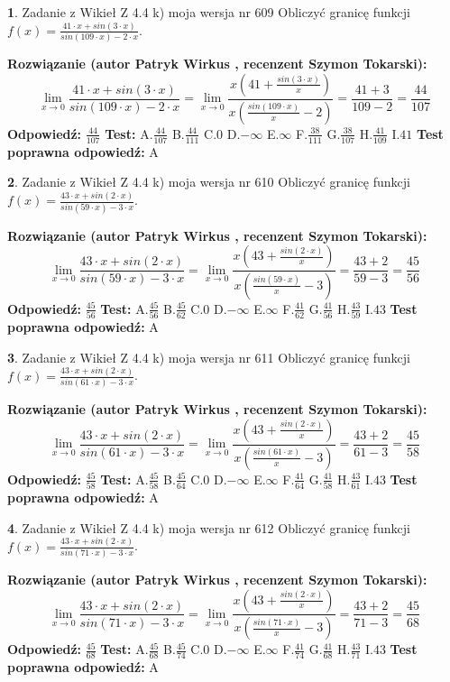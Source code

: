 \documentclass[12pt, a4paper]{article}
\theoremstyle{definition} %
\newtheorem{zad}{}
\newcommand{\zadStart}[1]{\begin{zad}#1\newline}
\newcommand{\zadStop}{\end{zad}}
\newcommand{\rozwStart}[2]{\noindent \textbf{Rozwiązanie (autor #1 , recenzent #2): }\newline}
\newcommand{\rozwStop}{\newline}
\newcommand{\odpStart}{\noindent \textbf{Odpowiedź:}\newline}
\newcommand{\odpStop}{\newline}
\newcommand{\testStart}{\noindent \textbf{Test:}\newline}
\newcommand{\testStop}{\newline}
\newcommand{\kluczStart}{\noindent \textbf{Test poprawna odpowiedź:}\newline}
\newcommand{\kluczStop}{\newline}
\begin{document}
\zadStart{Zadanie z Wikieł Z 4.4 k) moja wersja nr 609}
Obliczyć granicę funkcji $f(x)=\frac{41\cdot x +sin(3\cdot x)}{sin(109\cdot x) -2\cdot x}$.
\zadStop
\rozwStart{Patryk Wirkus}{Szymon Tokarski}
$$\lim\limits_{x\to 0}\frac{41\cdot x +sin(3\cdot x)}{sin(109\cdot x) -2\cdot x}
=\lim\limits_{x\to 0}\frac{x(41+\frac{sin(3\cdot x)}{x})}{x(\frac{sin(109\cdot x)}{x}-2)}
=\frac{41+3}{109-2} = \frac{44}{107}$$
\rozwStop
\odpStart
$\frac{44}{107}$
\odpStop
\testStart
A.$\frac{44}{107}$
B.$\frac{44}{111}$
C.$0$
D.$-\infty$
E.$\infty$
F.$\frac{38}{111}$
G.$\frac{38}{107}$
H.$\frac{41}{109}$
I.$41$
\testStop
\kluczStart
A
\kluczStop



\zadStart{Zadanie z Wikieł Z 4.4 k) moja wersja nr 610}
Obliczyć granicę funkcji $f(x)=\frac{43\cdot x +sin(2\cdot x)}{sin(59\cdot x) -3\cdot x}$.
\zadStop
\rozwStart{Patryk Wirkus}{Szymon Tokarski}
$$\lim\limits_{x\to 0}\frac{43\cdot x +sin(2\cdot x)}{sin(59\cdot x) -3\cdot x}
=\lim\limits_{x\to 0}\frac{x(43+\frac{sin(2\cdot x)}{x})}{x(\frac{sin(59\cdot x)}{x}-3)}
=\frac{43+2}{59-3} = \frac{45}{56}$$
\rozwStop
\odpStart
$\frac{45}{56}$
\odpStop
\testStart
A.$\frac{45}{56}$
B.$\frac{45}{62}$
C.$0$
D.$-\infty$
E.$\infty$
F.$\frac{41}{62}$
G.$\frac{41}{56}$
H.$\frac{43}{59}$
I.$43$
\testStop
\kluczStart
A
\kluczStop



\zadStart{Zadanie z Wikieł Z 4.4 k) moja wersja nr 611}
Obliczyć granicę funkcji $f(x)=\frac{43\cdot x +sin(2\cdot x)}{sin(61\cdot x) -3\cdot x}$.
\zadStop
\rozwStart{Patryk Wirkus}{Szymon Tokarski}
$$\lim\limits_{x\to 0}\frac{43\cdot x +sin(2\cdot x)}{sin(61\cdot x) -3\cdot x}
=\lim\limits_{x\to 0}\frac{x(43+\frac{sin(2\cdot x)}{x})}{x(\frac{sin(61\cdot x)}{x}-3)}
=\frac{43+2}{61-3} = \frac{45}{58}$$
\rozwStop
\odpStart
$\frac{45}{58}$
\odpStop
\testStart
A.$\frac{45}{58}$
B.$\frac{45}{64}$
C.$0$
D.$-\infty$
E.$\infty$
F.$\frac{41}{64}$
G.$\frac{41}{58}$
H.$\frac{43}{61}$
I.$43$
\testStop
\kluczStart
A
\kluczStop



\zadStart{Zadanie z Wikieł Z 4.4 k) moja wersja nr 612}
Obliczyć granicę funkcji $f(x)=\frac{43\cdot x +sin(2\cdot x)}{sin(71\cdot x) -3\cdot x}$.
\zadStop
\rozwStart{Patryk Wirkus}{Szymon Tokarski}
$$\lim\limits_{x\to 0}\frac{43\cdot x +sin(2\cdot x)}{sin(71\cdot x) -3\cdot x}
=\lim\limits_{x\to 0}\frac{x(43+\frac{sin(2\cdot x)}{x})}{x(\frac{sin(71\cdot x)}{x}-3)}
=\frac{43+2}{71-3} = \frac{45}{68}$$
\rozwStop
\odpStart
$\frac{45}{68}$
\odpStop
\testStart
A.$\frac{45}{68}$
B.$\frac{45}{74}$
C.$0$
D.$-\infty$
E.$\infty$
F.$\frac{41}{74}$
G.$\frac{41}{68}$
H.$\frac{43}{71}$
I.$43$
\testStop
\kluczStart
A
\kluczStop
\end{document}
